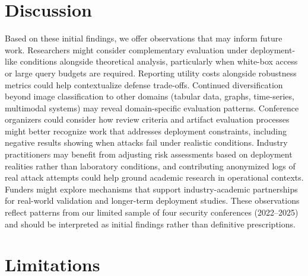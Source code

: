 \documentclass[runningheads]{llncs}
\begin{document}
\section{Discussion}
\label{sec:discussion}

Based on these initial findings, we offer observations that may inform future work. Researchers might consider complementary evaluation under deployment-like conditions alongside theoretical analysis, particularly when white-box access or large query budgets are required. Reporting utility costs alongside robustness metrics could help contextualize defense trade-offs. Continued diversification beyond image classification to other domains (tabular data, graphs, time-series, multimodal systems) may reveal domain-specific evaluation patterns. Conference organizers could consider how review criteria and artifact evaluation processes might better recognize work that addresses deployment constraints, including negative results showing when attacks fail under realistic conditions. Industry practitioners may benefit from adjusting risk assessments based on deployment realities rather than laboratory conditions, and contributing anonymized logs of real attack attempts could help ground academic research in operational contexts. Funders might explore mechanisms that support industry-academic partnerships for real-world validation and longer-term deployment studies. These observations reflect patterns from our limited sample of four security conferences (2022--2025) and should be interpreted as initial findings rather than definitive prescriptions.

\section{Limitations}
\label{sec:limitations}
\end{document}

